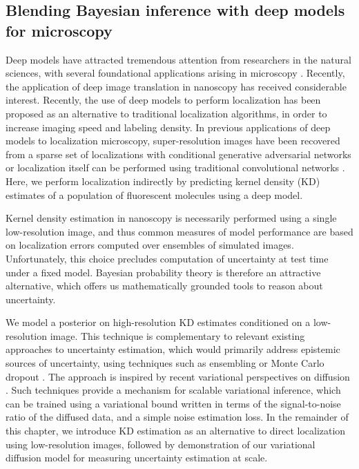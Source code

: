 
\subsection{Blending Bayesian inference with deep models for microscopy}

Deep models have attracted tremendous attention from researchers in the natural sciences, with several foundational applications arising in microscopy \parencite{Weigert2018,Falk2019}. Recently, the application of deep image translation in nanoscopy has received considerable interest. Recently, the use of deep models to perform localization has been proposed as an alternative to traditional localization algorithms, in order to increase imaging speed and labeling density. In previous applications of deep models to localization microscopy, super-resolution images have been recovered from a sparse set of localizations with conditional generative adversarial networks \parencite{Ouyang2018} or localization itself can be performed using traditional convolutional networks \parencite{Nehme2020,Speiser2021}. Here, we perform localization indirectly by predicting kernel density (KD) estimates of a population of fluorescent molecules using a deep model. 

Kernel density estimation in nanoscopy is necessarily performed using a single low-resolution image, and thus common measures of model performance are based on localization errors computed over ensembles of simulated images. Unfortunately, this choice precludes computation of uncertainty at test time under a fixed model. Bayesian probability theory is therefore an attractive alternative, which offers us mathematically grounded tools to reason about uncertainty. 

We model a posterior on high-resolution KD estimates conditioned on a low-resolution image. This technique is complementary to relevant existing approaches to uncertainty estimation, which would primarily address epistemic sources of uncertainty, using techniques such as ensembling \parencite{Lakshminarayanan2017} or Monte Carlo dropout \parencite{Gal2022}. The approach is inspired by recent variational perspectives on diffusion \parencite{Dirmeier2023,Ribeiro2024,Kingma2021,Kingma2023}.  Such techniques provide a mechanism for scalable variational inference, which can be trained using a variational bound written in terms of the signal-to-noise ratio of the diffused data, and a simple noise estimation loss. In the remainder of this chapter, we introduce KD estimation as an alternative to direct localization using low-resolution images, followed by demonstration of our variational diffusion model for measuring uncertainty estimation at scale. 

